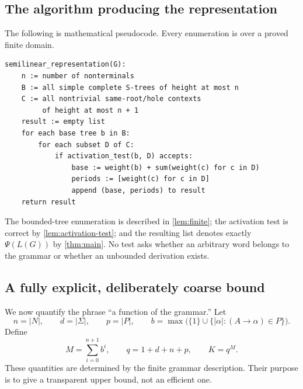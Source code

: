 \documentclass[11pt,a4paper]{article}
\numberwithin{equation}{section}
\theoremstyle{plain}
\theoremstyle{definition}
\theoremstyle{remark}
\begin{document}
\subsection{The algorithm producing the representation}
The following is mathematical pseudocode. Every enumeration is over a proved finite domain.
\begin{lstlisting}
semilinear_representation(G):
    n := number of nonterminals
    B := all simple complete S-trees of height at most n
    C := all nontrivial same-root/hole contexts
         of height at most n + 1
    result := empty list
    for each base tree b in B:
        for each subset D of C:
            if activation_test(b, D) accepts:
                base := weight(b) + sum(weight(c) for c in D)
                periods := [weight(c) for c in D]
                append (base, periods) to result
    return result
\end{lstlisting}

The bounded-tree enumeration is described in \cref{lem:finite}; the activation test is correct by \cref{lem:activation-test}; and the resulting list denotes exactly $\Psi(L(G))$ by \cref{thm:main}. No test asks whether an arbitrary word belongs to the grammar or whether an unbounded derivation exists.

\subsection{A fully explicit, deliberately coarse bound}\label{subsec:bounds}
We now quantify the phrase ``a function of the grammar.'' Let
\[
n=|N|,\qquad d=|\Sigma|,\qquad p=|P|,
\qquad b=\max\bigl(\{1\}\cup\{|\alpha|:(A\to\alpha)\in P\}\bigr).
\]
Define
\begin{equation}\label{eq:bound-defs}
M=\sum_{i=0}^{n+1}b^i,\qquad
q=1+d+n+p,\qquad K=q^M.
\end{equation}
These quantities are determined by the finite grammar description. Their purpose is to give a transparent upper bound, not an efficient one.
\end{document}
